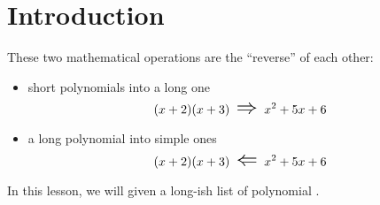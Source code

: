 \section{Introduction}

\begin{tcolorbox}[center,width=5.5in]
    These two mathematical operations are the ``reverse'' of each other:
    \begin{itemize}
        \item {} short polynomials into a long one
        \[
            (x + 2)(x+3)  \text{\LARGE\,\,$\Rightarrow$\,\,}  x^2 + 5x + 6
        \]
        \item {} a long polynomial into simple ones
        \[
            (x + 2)(x+3)  \text{\LARGE\,\,$\Leftarrow$\,\,}  x^2 + 5x + 6
        \]
    \end{itemize}
\end{tcolorbox}

In this lesson, we will   
given a long-ish list of polynomial  .